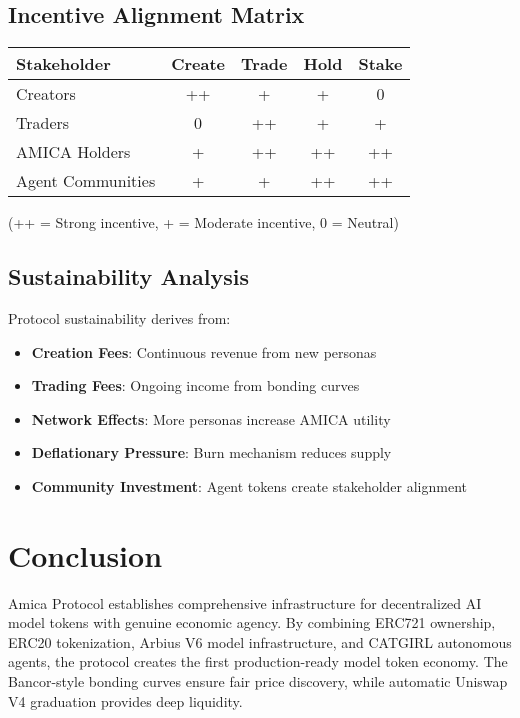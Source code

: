 \documentclass{article}
\begin{document}
\subsection{Incentive Alignment Matrix}

\begin{center}
\begin{tabular}{|l|c|c|c|c|}
\hline
\textbf{Stakeholder} & \textbf{Create} & \textbf{Trade} & \textbf{Hold} & \textbf{Stake} \\
\hline
Creators & ++ & + & + & 0 \\
Traders & 0 & ++ & + & + \\
AMICA Holders & + & ++ & ++ & ++ \\
Agent Communities & + & + & ++ & ++ \\
\hline
\end{tabular}
\end{center}

(++ = Strong incentive, + = Moderate incentive, 0 = Neutral)

\subsection{Sustainability Analysis}

Protocol sustainability derives from:
\begin{itemize}
    \item \textbf{Creation Fees}: Continuous revenue from new personas
    \item \textbf{Trading Fees}: Ongoing income from bonding curves
    \item \textbf{Network Effects}: More personas increase AMICA utility
    \item \textbf{Deflationary Pressure}: Burn mechanism reduces supply
    \item \textbf{Community Investment}: Agent tokens create stakeholder alignment
\end{itemize}

\section{Conclusion}

Amica Protocol establishes comprehensive infrastructure for decentralized AI model tokens with genuine economic agency. By combining ERC721 ownership, ERC20 tokenization, Arbius V6 model infrastructure, and CATGIRL autonomous agents, the protocol creates the first production-ready model token economy. The Bancor-style bonding curves ensure fair price discovery, while automatic Uniswap V4 graduation provides deep liquidity.
\end{document}
